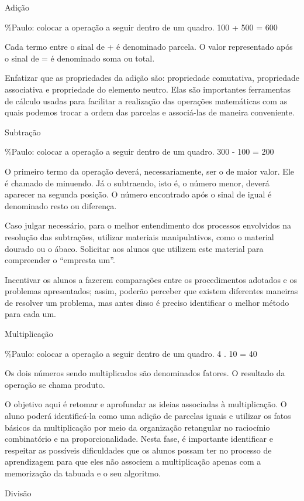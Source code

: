 Adição

\%Paulo: colocar a operação a seguir dentro de um quadro. 100 + 500 =
600

Cada termo entre o sinal de + é denominado parcela. O valor representado
após o sinal de = é denominado soma ou total.

Enfatizar que as propriedades da adição são: propriedade comutativa,
propriedade associativa e propriedade do elemento neutro. Elas são
importantes ferramentas de cálculo usadas para facilitar a realização
das operações matemáticas com as quais podemos trocar a ordem das
parcelas e associá-las de maneira conveniente.

Subtração

\%Paulo: colocar a operação a seguir dentro de um quadro. 300 - 100 =
200

O primeiro termo da operação deverá, necessariamente, ser o de maior
valor. Ele é chamado de minuendo. Já o subtraendo, isto é, o número
menor, deverá aparecer na segunda posição. O número encontrado após o
sinal de igual é denominado resto ou diferença.

Caso julgar necessário, para o melhor entendimento dos processos
envolvidos na resolução das subtrações, utilizar materiais
manipulativos, como o material dourado ou o ábaco. Solicitar aos alunos
que utilizem este material para compreender o ``empresta um''.

Incentivar os alunos a fazerem comparações entre os procedimentos
adotados e os problemas apresentados; assim, poderão perceber que
existem diferentes maneiras de resolver um problema, mas antes disso é
preciso identificar o melhor método para cada um.

Multiplicação

\%Paulo: colocar a operação a seguir dentro de um quadro. 4 . 10 = 40

Os dois números sendo multiplicados são denominados fatores. O resultado
da operação se chama produto.

O objetivo aqui é retomar e aprofundar as ideias associadas à
multiplicação. O aluno poderá identificá-la como uma adição de parcelas
iguais e utilizar os fatos básicos da multiplicação por meio da
organização retangular no raciocínio combinatório e na
proporcionalidade. Nesta fase, é importante identificar e respeitar as
possíveis dificuldades que os alunos possam ter no processo de
aprendizagem para que eles não associem a multiplicação apenas com a
memorização da tabuada e o seu algoritmo.

Divisão

